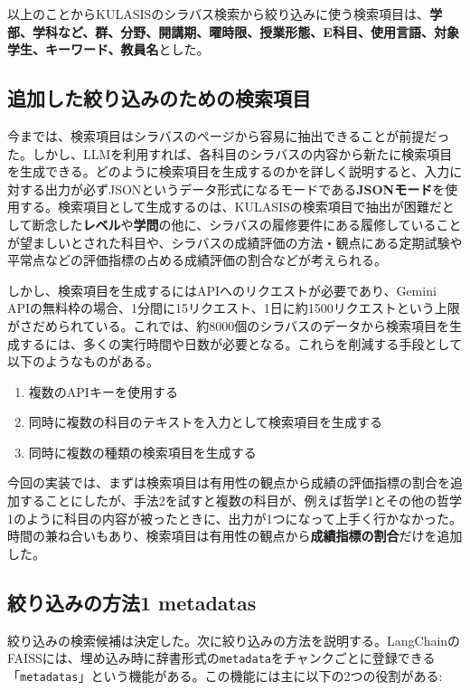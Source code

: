 以上のことからKULASISのシラバス検索から絞り込みに使う検索項目は、\textbf{学部、学科など、群、分野、開講期、曜時限、授業形態、E科目、使用言語、対象学生、キーワード、教員名}とした。

\subsection{追加した絞り込みのための検索項目}\label{sec:additional-search-item}
今までは、検索項目はシラバスのページから容易に抽出できることが前提だった。しかし、LLMを利用すれば、各科目のシラバスの内容から新たに検索項目を生成できる。どのように検索項目を生成するのかを詳しく説明すると、入力に対する出力が必ずJSONというデータ形式になるモードである\textbf{JSONモード}を使用する。検索項目として生成するのは、KULASISの検索項目で抽出が困難だとして断念した\textbf{レベル}や\textbf{学問}の他に、シラバスの履修要件にある履修していることが望ましいとされた科目や、シラバスの成績評価の方法・観点にある定期試験や平常点などの評価指標の占める成績評価の割合などが考えられる。

しかし、検索項目を生成するにはAPIへのリクエストが必要であり、Gemini APIの無料枠の場合、1分間に15リクエスト、1日に約1500リクエストという上限がさだめられている。これでは、約8000個のシラバスのデータから検索項目を生成するには、多くの実行時間や日数が必要となる。これらを削減する手段として以下のようなものがある。

\begin{enumerate}
  \item 複数のAPIキーを使用する
  \item 同時に複数の科目のテキストを入力として検索項目を生成する
  \item 同時に複数の種類の検索項目を生成する
\end{enumerate}

今回の実装では、まずは検索項目は有用性の観点から成績の評価指標の割合を追加することにしたが、手法2を試すと複数の科目が、例えば哲学1とその他の哲学1のように科目の内容が被ったときに、出力が1つになって上手く行かなかった。時間の兼ね合いもあり、検索項目は有用性の観点から\textbf{成績指標の割合}だけを追加した。

\subsection{絞り込みの方法1 metadatas}
絞り込みの検索候補は決定した。次に絞り込みの方法を説明する。LangChainのFAISSには、埋め込み時に辞書形式の\texttt{metadata}をチャンクごとに登録できる「\texttt{metadatas}」という機能がある。この機能には主に以下の2つの役割がある:

